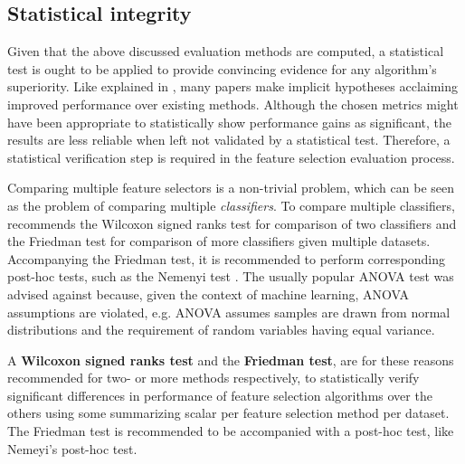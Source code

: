 \documentclass[../main.tex]{subfiles}
\begin{document}
\subsection{Statistical integrity}
Given that the above discussed evaluation methods are computed, a statistical test is ought to be applied to provide convincing evidence for any algorithm's superiority. Like explained in \citep{demsar_statistical_2006}, many papers make implicit hypotheses acclaiming improved performance over existing methods. Although the chosen metrics might have been appropriate to statistically show performance gains as significant, the results are less reliable when left not validated by a statistical test. Therefore, a statistical verification step is required in the feature selection evaluation process.

Comparing multiple feature selectors is a non-trivial problem, which can be seen as the problem of comparing multiple \textit{classifiers}. To compare multiple classifiers, \citep{demsar_statistical_2006} recommends the Wilcoxon signed ranks test for comparison of two classifiers and the Friedman test for comparison of more classifiers given multiple datasets. Accompanying the Friedman test, it is recommended to perform corresponding post-hoc tests, such as the Nemenyi test \citep{nemenyi_distribution-free_1963}. The usually popular ANOVA test was advised against because, given the context of machine learning, ANOVA assumptions are violated, e.g. ANOVA assumes samples are drawn from normal distributions and the requirement of random variables having equal variance.

A \textbf{Wilcoxon signed ranks test} and the \textbf{Friedman test}, are for these reasons recommended for two- or more methods respectively, to statistically verify significant differences in performance of feature selection algorithms over the others using some summarizing scalar per feature selection method per dataset. The Friedman test is recommended to be accompanied with a post-hoc test, like Nemeyi's post-hoc test.

\biblio
\end{document}
